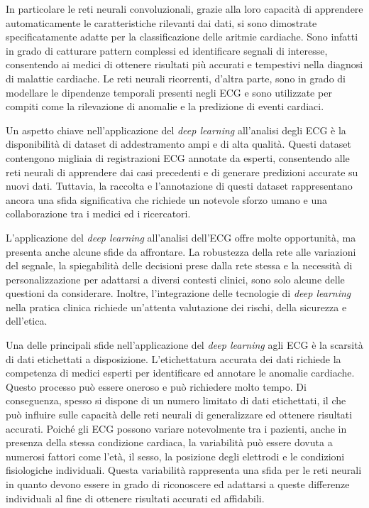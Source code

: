 \documentclass[12pt,italian]{report}
\begin{document}
	In particolare le reti neurali convoluzionali, grazie alla loro capacità di apprendere automaticamente le caratteristiche rilevanti dai dati, si sono dimostrate specificatamente adatte per la classificazione delle aritmie cardiache. Sono infatti in grado di catturare pattern complessi ed identificare segnali di interesse, consentendo ai medici di ottenere risultati più accurati e tempestivi nella diagnosi di malattie cardiache. Le reti neurali ricorrenti, d'altra parte, sono in grado di modellare le dipendenze temporali presenti negli ECG e sono utilizzate per compiti come la rilevazione di anomalie e la predizione di eventi cardiaci.
	
	Un aspetto chiave nell'applicazione del \textit{deep learning} all'analisi degli ECG è la disponibilità di dataset di addestramento ampi e di alta qualità. Questi dataset contengono migliaia di registrazioni ECG annotate da esperti, consentendo alle reti neurali di apprendere dai casi precedenti e di generare predizioni accurate su nuovi dati. Tuttavia, la raccolta e l'annotazione di questi dataset rappresentano ancora una sfida significativa che richiede un notevole sforzo umano e una collaborazione tra i medici ed i ricercatori.
	
	L'applicazione del \textit{deep learning} all'analisi dell'ECG offre molte opportunità, ma presenta anche alcune sfide da affrontare. La robustezza della rete alle variazioni del segnale, la spiegabilità delle decisioni prese dalla rete stessa e la necessità di personalizzazione per adattarsi a diversi contesti clinici, sono solo alcune delle questioni da considerare. Inoltre, l'integrazione delle tecnologie di \textit{deep learning} nella pratica clinica richiede un'attenta valutazione dei rischi, della sicurezza e dell'etica.
	
	Una delle principali sfide nell'applicazione del \textit{deep learning} agli ECG è la scarsità di dati etichettati a disposizione. L'etichettatura accurata dei dati richiede la competenza di medici esperti per identificare ed annotare le anomalie cardiache. Questo processo può essere oneroso e può richiedere molto tempo. Di conseguenza, spesso si dispone di un numero limitato di dati etichettati, il che può influire sulle capacità delle reti neurali di generalizzare ed ottenere risultati accurati. Poiché gli ECG possono variare notevolmente tra i pazienti, anche in presenza della stessa condizione cardiaca, la variabilità può essere dovuta a numerosi fattori come l'età, il sesso, la posizione degli elettrodi e le condizioni fisiologiche individuali. Questa variabilità rappresenta una sfida per le reti neurali in quanto devono essere in grado di riconoscere ed adattarsi a queste differenze individuali al fine di ottenere risultati accurati ed affidabili.
	
\end{document}
